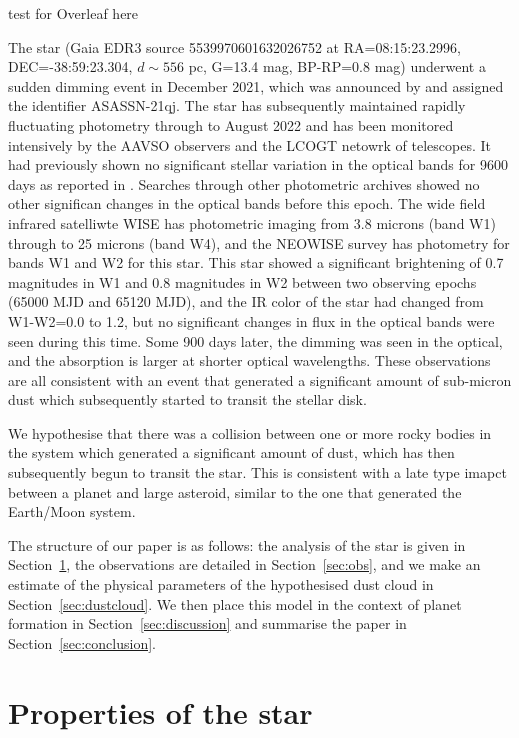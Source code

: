 \documentclass{aa}
\begin{document}
test for Overleaf here

   The star (Gaia EDR3 source 5539970601632026752 at RA=08:15:23.2996, DEC=-38:59:23.304, $d\sim 556$ pc, G=13.4 mag, BP-RP=0.8 mag) underwent a sudden dimming event in December 2021, which was announced by \citet{RizzoSmith21} and assigned the identifier ASASSN-21qj.
   The star has subsequently maintained rapidly fluctuating photometry through to August 2022 \citep{RizzoSmith22} and has been monitored intensively by the AAVSO observers and the LCOGT netowrk of telescopes.
   It had previously shown no significant stellar variation in the optical bands for 9600 days as reported in \citet{RizzoSmith21}.
   Searches through other photometric archives showed no other significan changes in the optical bands before this epoch.
   The wide field infrared satelliwte WISE has photometric imaging from 3.8 microns (band W1) through to 25 microns (band W4), and the NEOWISE survey has photometry for bands W1 and W2 for this star.
   This star showed a significant brightening of 0.7 magnitudes in W1 and 0.8 magnitudes in W2 between two observing epochs (65000 MJD and 65120 MJD), and the IR color of the star had changed from W1-W2=0.0 to 1.2, but no significant changes in flux in the optical bands were seen during this time.
   Some 900 days later, the dimming was seen in the optical, and the absorption is larger at shorter optical wavelengths.
   These observations are all consistent with an event that generated a significant amount of sub-micron dust which subsequently started to transit the stellar disk.

   We hypothesise that there was a collision between one or more rocky bodies in the system which generated a significant amount of dust, which has then subsequently begun to transit the star.
   This is consistent with a late type imapct between a planet and large asteroid, similar to the one that generated the Earth/Moon system.

   The structure of our paper is as follows: the analysis of the star is given in Section~\ref{sec:star}, the observations are detailed in Section~\ref{sec:obs}, and we make an estimate of the physical parameters of the hypothesised dust cloud in Section~\ref{sec:dustcloud}.
   We then place this model in the context of planet formation in Section~\ref{sec:discussion} and summarise the paper in Section~\ref{sec:conclusion}.

\section{Properties of the star}\label{sec:star}
\end{document}
